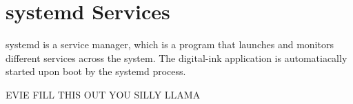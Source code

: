 \section{systemd Services}
systemd is a service manager, which is a program that launches and monitors different services across the system. The digital-ink application is automatiacally started upon boot by the systemd process.



EVIE FILL THIS OUT YOU SILLY LLAMA